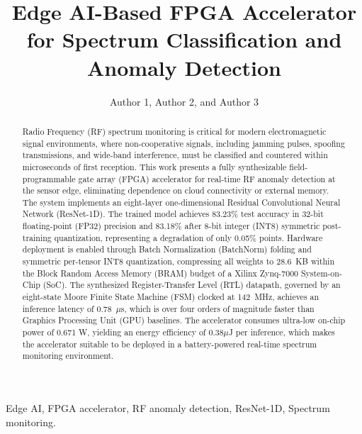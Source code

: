 \documentclass[conference]{IEEEtran}
\begin{document}
\title{Edge AI-Based FPGA Accelerator for Spectrum Classification and Anomaly Detection}

\author{Author 1, Author 2, and Author 3
  }
\maketitle


\begin{abstract}
Radio Frequency (RF) spectrum monitoring is critical for modern electromagnetic signal environments, where non-cooperative signals, including jamming pulses, spoofing transmissions, and wide-band interference, must be classified and countered within microseconds of first reception. This work presents a fully synthesizable field-programmable gate array (FPGA) accelerator for real-time RF anomaly detection at the sensor edge, eliminating dependence on cloud connectivity or external memory. The system implements an eight-layer one-dimensional Residual Convolutional Neural Network (ResNet-1D).
The trained model achieves 83.23\% test accuracy in 32-bit floating-point (FP32) precision and 83.18\% after 8-bit integer (INT8) symmetric post-training quantization, representing a degradation of only 0.05\% points. Hardware deployment is enabled through Batch Normalization (BatchNorm) folding and symmetric per-tensor INT8 quantization, compressing all weights to 28.6~KB within the Block Random Access Memory (BRAM) budget of a Xilinx Zynq-7000 System-on-Chip (SoC). The synthesized Register-Transfer Level (RTL) datapath, governed by an eight-state Moore Finite State Machine (FSM) clocked at 142~MHz, achieves an inference latency of 0.78~$\mu$s, which is over four orders of magnitude faster than Graphics Processing Unit (GPU) baselines. The accelerator consumes ultra-low on-chip power of 0.671 W, yielding an energy efficiency of 0.38$\mu$J per inference, which makes the accelerator suitable to be deployed in a battery-powered real-time spectrum monitoring environment.
\end{abstract}

\begin{IEEEkeywords}
Edge AI, FPGA accelerator, RF anomaly detection, ResNet-1D, Spectrum monitoring.
\end{IEEEkeywords}
\end{document}
